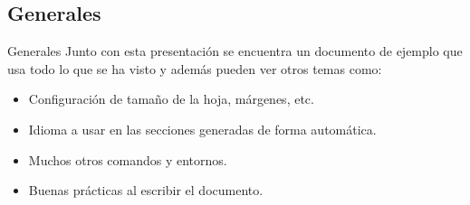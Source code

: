 \subsection{Generales}
\begin{frame}[fragile]{Generales}
Junto con esta presentación se encuentra un documento de ejemplo que usa todo
lo que se ha visto y además pueden ver otros temas como:

\begin{itemize}
  \item Configuración de tamaño de la hoja, márgenes, etc.
  \item Idioma a usar en las secciones generadas de forma automática.
  \item Muchos otros comandos y entornos.
  \item Buenas prácticas al escribir el documento.
\end{itemize}
\end{frame}
